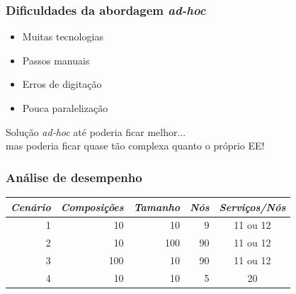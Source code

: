 \documentclass{beamer}
\newcommand\adhoc{\emph{ad-hoc}\xspace}
\begin{document}

\begin{frame}
\frametitle{Dificuldades da abordagem \adhoc}

\begin{itemize}
\item Muitas tecnologias
\item Passos manuais
\item Erros de digitação
\item Pouca paralelização
\end{itemize}

\vspace{0.5cm}

Solução \adhoc até poderia ficar melhor... \\
mas poderia ficar quase tão complexa quanto o próprio EE!


\end{frame}



\begin{frame}
\frametitle{Análise de desempenho}

\begin{table}
\centering
\begin{tabular}{r r r r c} \hline
\emph{Cenário} & \emph{Composições} & \emph{Tamanho} & \emph{Nós} & \emph{Serviços/Nós} \\ \hline
1 &  10 &  10 &  9 & 11 ou 12 \\
2 &  10 & 100 & 90 & 11 ou 12 \\
3 & 100 &  10 & 90 & 11 ou 12 \\
4 &  10 &  10 &  5 &       20 \\
\hline \end{tabular}
\end{table}

\end{frame}


\end{document}
